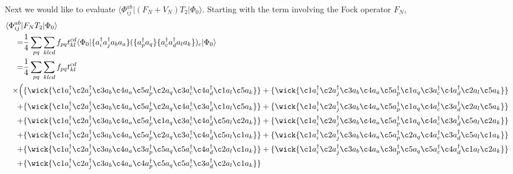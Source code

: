 \documentclass[
    a4paper, aps, twocolumn, floatfix, superscriptaddress,
    nofootinbib]{revtex4-1}
\newcommand{\1}{\mathds{1}}
\newcommand{\bra}[1]{\langle #1\lvert}
\newcommand{\ket}[1]{\rvert #1\rangle}
\begin{document}
        Next we would like to evaluate $\bra{\Phi_{ij}^{ab}}(F_N + V_N)T_2\ket{\Phi_0}$. Starting with the
        term involving the Fock operator $F_N$,
        \begin{equation}
        \begin{aligned}
            \bra{\Phi_{ij}^{ab}}&F_NT_2\ket{\Phi_0} \\
                =& \frac{1}{4}\sum_{pq}\sum_{klcd}f_{pq}t_{kl}^{cd} \bra{\Phi_0}
                    \{a_i^\dagger a_j^\dagger a_b a_a \}(\{a^\dagger_pa_q \}\{a^\dagger_c a^\dagger_d a_l a_k \})_c \ket{\Phi_0} \\
                =& \frac{1}{4}\sum_{pq}\sum_{klcd}f_{pq} t_{kl}^{cd} \\
                \times \Big(
                    &\{\wick{\c1 a^\dagger_i \c2 a^\dagger_j \c3 a_b \c4 a_a \c5 a^\dagger_p \c2 a_q \c3 a^\dagger_c \c4 a^\dagger_d \c1 a_l \c5 a_k } \}
                 + \{\wick{\c1 a^\dagger_i \c2 a^\dagger_j \c3 a_b \c4 a_a \c5 a^\dagger_p \c1 a_q \c3 a^\dagger_c \c4 a^\dagger_d \c2 a_l \c5 a_k } \}    \\
                + &\{\wick{\c1 a^\dagger_i \c2 a^\dagger_j \c3 a_b \c4 a_a \c5 a^\dagger_p \c2 a_q \c4 a^\dagger_c \c3 a^\dagger_d \c1 a_l \c5 a_k } \}
                 + \{\wick{\c1 a^\dagger_i \c2 a^\dagger_j \c3 a_b \c4 a_a \c5 a^\dagger_p \c1 a_q \c4 a^\dagger_c \c3 a^\dagger_d \c2 a_l \c5 a_k } \} \\
                + &\{\wick{\c1 a^\dagger_i \c2 a^\dagger_j \c3 a_b \c4 a_a \c5 a^\dagger_p \c1 a_q \c3 a^\dagger_c \c4 a^\dagger_d \c5 a_l \c2 a_k } \}
                  + \{\wick{\c1 a^\dagger_i \c2 a^\dagger_j \c3 a_b \c4 a_a \c5 a^\dagger_p \c1 a_q \c4 a^\dagger_c \c3 a^\dagger_d \c5 a_l \c2 a_k } \} \\
                + &\{\wick{\c1 a^\dagger_i \c2 a^\dagger_j \c3 a_b \c4 a_a \c5 a^\dagger_p \c2 a_q \c3 a^\dagger_c \c4 a^\dagger_d \c5 a_l \c1 a_k } \}
                  + \{\wick{\c1 a^\dagger_i \c2 a^\dagger_j \c3 a_b \c4 a_a \c5 a^\dagger_p \c2 a_q \c4 a^\dagger_c \c3 a^\dagger_d \c5 a_l \c1 a_k } \} \\
                + &\{\wick{\c1 a^\dagger_i \c2 a^\dagger_j \c3 a_b \c4 a_a \c3 a^\dagger_p \c5 a_q \c5 a^\dagger_c \c4 a^\dagger_d \c2 a_l \c1 a_k } \}
                  + \{\wick{\c1 a^\dagger_i \c2 a^\dagger_j \c3 a_b \c4 a_a \c3 a^\dagger_p \c5 a_q \c5 a^\dagger_c \c4 a^\dagger_d \c1 a_l \c2 a_k } \} \\
                + &\{\wick{\c1 a^\dagger_i \c2 a^\dagger_j \c3 a_b \c4 a_a \c4 a^\dagger_p \c5 a_q \c5 a^\dagger_c \c3 a^\dagger_d \c2 a_l \c1 a_k } \}

\end{aligned}
\end{equation}
\end{document}
